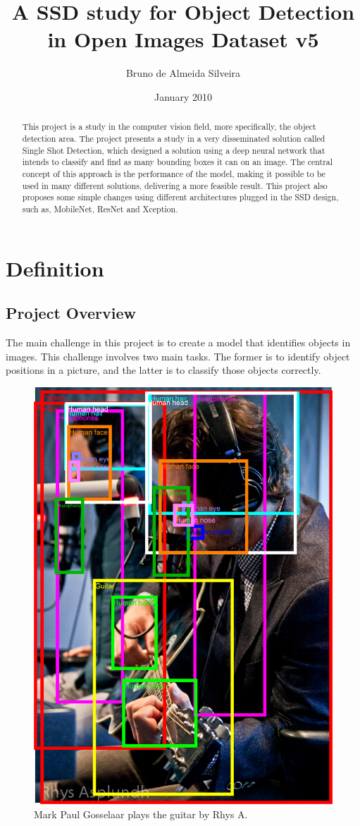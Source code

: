 \documentclass[11pt, a4paper, twocolumn]{article}
\title{\textbf{A SSD study for Object Detection in Open Images Dataset v5}}
\author{Bruno de Almeida Silveira}
\date{January 2010}
\begin{document}
\begin{titlingpage}
	\maketitle
	\begin{abstract}
		This project is a study in the computer vision field, more specifically, the object detection area. The project presents a study in a very disseminated solution called Single Shot Detection, which designed a solution using a deep neural network that intends to classify and find as many bounding boxes it can on an image. The central concept of this approach is the performance of the model, making it possible to be used in many different solutions, delivering a more feasible result. This project also proposes some simple changes using different architectures plugged in the SSD design, such as, MobileNet, ResNet and Xception.
	\end{abstract}
\end{titlingpage}

\section{Definition}
\subsection{Project Overview}
The main challenge in this project is to create a model that identifies objects in images. This challenge involves two main tasks. The former is to identify object positions in a picture, and the latter is to classify those objects correctly. 

\begin{figure}[ht]
	\centering
	\includegraphics[width=.4\textwidth]{intro-1.png}
	\caption{\scriptsize Mark Paul Gosselaar plays the guitar by Rhys A. \cite{google:1}}
\end{figure}
\end{document}
